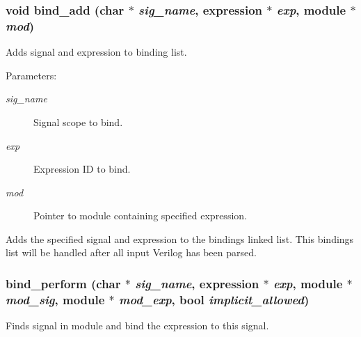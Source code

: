 \subsubsection{\setlength{\rightskip}{0pt plus 5cm}void bind\_\-add (char $\ast$ {\em sig\_\-name}, {\bf expression} $\ast$ {\em exp}, {\bf module} $\ast$ {\em mod})}\label{binding_8c_a5}


Adds signal and expression to binding list.

\begin{Desc}
\item[Parameters: ]\par
\begin{description}
\item[{\em 
sig\_\-name}]Signal scope to bind. \item[{\em 
exp}]Expression ID to bind. \item[{\em 
mod}]Pointer to module containing specified expression.\end{description}
\end{Desc}
Adds the specified signal and expression to the bindings linked list. This bindings list will be handled after all input Verilog has been parsed. 
\subsubsection{ bind\_\-perform (char $\ast$ {\em sig\_\-name}, {\bf expression} $\ast$ {\em exp}, {\bf module} $\ast$ {\em mod\_\-sig}, {\bf module} $\ast$ {\em mod\_\-exp}, {\bf bool} {\em implicit\_\-allowed})}\label{binding_8c_a7}


Finds signal in module and bind the expression to this signal.

